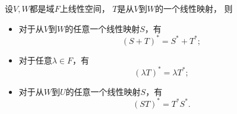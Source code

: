 \begin{property}
设\(V,W\)都是域\(F\)上线性空间，
\(T\)是从\(V\)到\(W\)的一个线性映射，
则\begin{itemize}
	\item 对于从\(V\)到\(W\)的任意一个线性映射\(S\)，有\begin{equation*}
		(S+T)^* = S^* + T^*;
	\end{equation*}
	\item 对于任意\(\lambda \in F\)，有\begin{equation*}
		(\lambda T)^* = \lambda T^*;
	\end{equation*}
	\item 对于从\(W\)到\(U\)的任意一个线性映射\(S\)，有\begin{equation*}
		(S T)^* = T^* S^*.
	\end{equation*}
\end{itemize}
\end{property}
